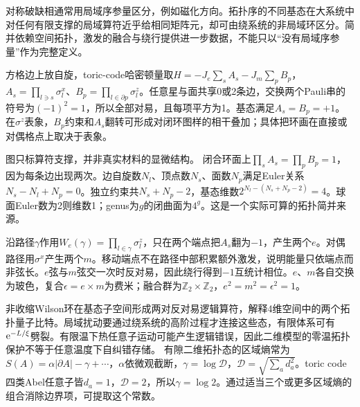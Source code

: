 \label{ch:topological}
对称破缺相通常用局域序参量区分，例如磁化方向。拓扑序的不同基态在大系统中对任何有限支撑的局域算符近乎给相同矩阵元，却可由绕系统的非局域环区分。简并依赖空间拓扑，激发的融合与绕行提供进一步数据，不能只以“没有局域序参量”作为完整定义。

方格边上放自旋，toric-code哈密顿量取$H=-J_e\sum_sA_s-J_m\sum_pB_p$，$A_s=\prod_{l\ni s}\sigma_l^x$、$B_p=\prod_{l\in\partial p}\sigma_l^z$。任意星与面共享0或2条边，交换两个Pauli串的符号为$(-1)^2=1$，所以全部对易，且每项平方为1。基态满足$A_s=B_p=+1$。在$\sigma^z$表象，$B_p$约束和$A_s$翻转可形成对闭环图样的相干叠加；具体把环画在直接或对偶格点上取决于表象。

\begin{center}\end{center}
图只标算符支撑，并非真实材料的显微结构。
闭合环面上$\prod_sA_s=\prod_pB_p=1$，因为每条边出现两次。边自旋数$N_l$、顶点数$N_s$、面数$N_p$满足Euler关系$N_s-N_l+N_p=0$。独立约束共$N_s+N_p-2$，基态维数$2^{N_l-(N_s+N_p-2)}=4$。球面Euler数为2则维数1；genus为$g$的闭曲面为$4^g$。这是一个实际可算的拓扑简并来源。

沿路径$\gamma$作用$W_e(\gamma)=\prod_{l\in\gamma}\sigma_l^z$，只在两个端点把$A_s$翻为$-1$，产生两个$e$。对偶路径用$\sigma^x$产生两个$m$。移动端点不在路径中部积累额外激发，说明能量只依端点而非弦长。$e$弦与$m$弦交一次时反对易，因此绕行得到$-1$互统计相位。$e$、$m$各自交换为玻色，复合$\epsilon=e\times m$为费米；融合群为$\mathbb Z_2\times\mathbb Z_2$，$e^2=m^2=\epsilon^2=1$。

非收缩Wilson环在基态子空间形成两对反对易逻辑算符，解释4维空间中的两个拓扑量子比特。局域扰动要通过绕系统的高阶过程才连接这些态，有限体系可有$\mathrm e^{-L/\xi}$劈裂。有限温下热任意子运动可能产生逻辑错误，因此二维模型的零温拓扑保护不等于任意温度下自纠错存储。
有隙二维拓扑态的区域熵常为$S(A)=\alpha|\partial A|-\gamma+\cdots$，$\alpha$依微观截断，$\gamma=\log\mathcal D$，$\mathcal D=\sqrt{\sum_ad_a^2}$。toric code四类Abel任意子皆$d_a=1$，$\mathcal D=2$，所以$\gamma=\log2$。通过适当三个或更多区域熵的组合消除边界项，可提取这个常数。

